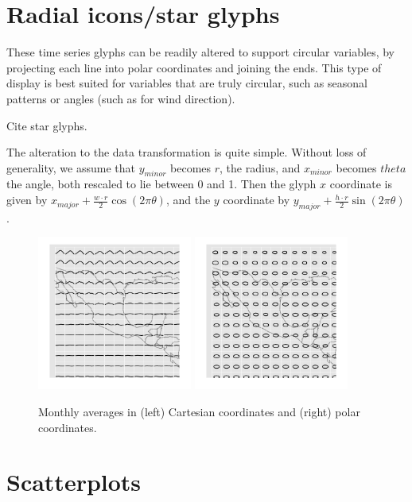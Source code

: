 \documentclass[oneside]{article}
\begin{document}
\section{Radial icons/star glyphs}

These time series glyphs can be readily altered to support circular variables, by projecting each line into polar coordinates and joining the ends. This type of display is best suited for variables that are truly circular, such as seasonal patterns or angles (such as for wind direction).

Cite star glyphs.

The alteration to the data transformation is quite simple. Without loss of generality, we assume that $y_{minor}$ becomes $r$, the radius, and $x_{minor}$ becomes $theta$ the angle, both rescaled to lie between 0 and 1. Then the glyph $x$ coordinate is given by $x_{major} + \frac{w \cdot r}{2} \cos(2 \pi \theta)$, and the $y$ coordinate by $y_{major} + \frac{h \cdot r}{2} \sin(2 \pi \theta)$.

\begin{figure}[htbp]
  \centering
  \includegraphics[width=2in]{month-cartesian}
  \includegraphics[width=2in]{month-polar}
    
  \caption{Monthly averages in (left) Cartesian coordinates and (right) polar coordinates.}
  
  \label{fig:cycle}
\end{figure}

\section{Scatterplots}
\end{document}
